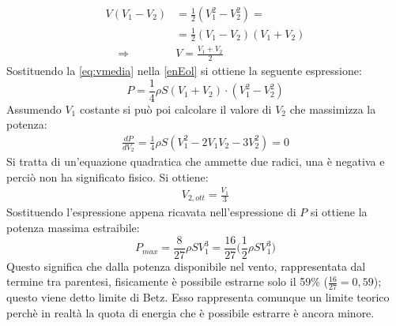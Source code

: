 \begin{align}
	V \left(V_1 - V_2 \right)& = \frac{1}{2} \left(V_1^2-V_2^2 \right) = \\
	& = \frac{1}{2} \left(V_1-V_2 \right)\left(V_1+V_2 \right) \\
	\;\;\;\; \Rightarrow \;\;\;\; & V = \frac{V_1 + V_2}{2}
	\label{eq:vmedia}
\end{align}
Sostituendo la \ref{eq:vmedia} nella \ref{enEol} si ottiene la seguente espressione:
\begin{equation}\label{eq:potfin}
P = \frac{1}{4} \rho S \left( V_1 +V_2 \right) \cdot \left(V_1^2 - V_2^2 \right)
\end{equation}
Assumendo $V_1$ costante si può poi calcolare il valore di $V_2$ che massimizza la potenza:
\begin{align*}
\frac{dP}{dV_2} = \frac{1}{4} \rho S \left( V_1^2 - 2 V_1 V_2 - 3 V_2^2 \right) = 0
\end{align*}
Si tratta di un'equazione quadratica che ammette due radici, una è negativa e perciò non ha significato fisico. Si ottiene:
\begin{align*}
V_{2,ott} = \frac{V_1}{3}
\end{align*}
Sostituendo l'espressione appena ricavata nell'espressione di $P$ si ottiene la potenza massima estraibile:
\begin{equation}
\boxed{P_{max} = \frac{8}{27} \rho S V_1^3 = \frac{16}{27} \bigg(\frac{1}{2} \rho S V_1^3\bigg)}
\end{equation}
Questo significa che dalla potenza disponibile nel vento, rappresentata dal termine tra parentesi, fisicamente è possibile estrarne solo il 59\% ($\frac{16}{27}=0,59$); questo viene detto limite di Betz. Esso rappresenta comunque un limite teorico perchè in realtà la quota di energia che è possibile estrarre è ancora minore.

